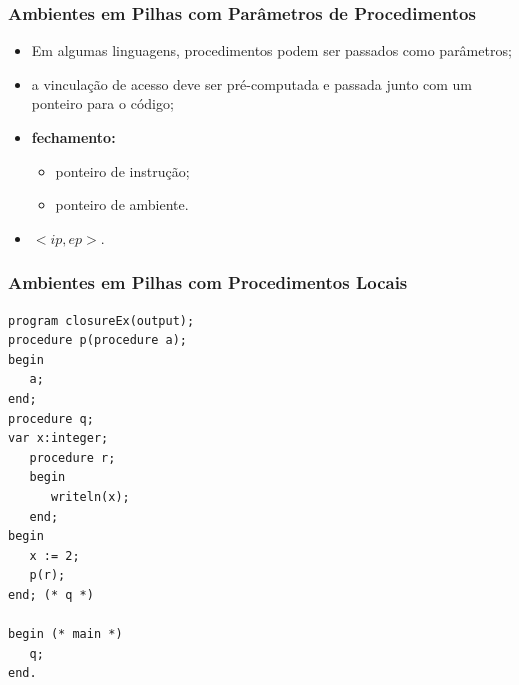 \documentclass[table]{beamer}
\begin{document}
\begin{frame}
   \frametitle{Ambientes em Pilhas com Parâmetros de Procedimentos}
   \begin{itemize}
      \item Em algumas linguagens, procedimentos podem ser passados como parâmetros;
      \item a vinculação de acesso deve ser pré-computada e passada junto com um ponteiro para o código;
      \item \textbf{fechamento:}
      \begin{itemize}
         \item ponteiro de instrução;
	 \item ponteiro de ambiente.
      \end{itemize}
      \item $<ip, ep>$.
   \end{itemize}
\end{frame}

\begin{frame}[fragile]
   \frametitle{Ambientes em Pilhas com Procedimentos Locais}
   \small
   \begin{verbatim}
program closureEx(output);
procedure p(procedure a);
begin
   a;
end;
procedure q;
var x:integer;
   procedure r;
   begin
      writeln(x);
   end;
begin
   x := 2;
   p(r);
end; (* q *)

begin (* main *)
   q;
end.
   \end{verbatim}
\end{frame}
\end{document}
